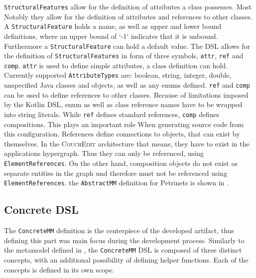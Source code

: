 
% 


% 

\texttt{StructuralFeatures} allow for the definition of attributes a class possesses. Most Notably they allow for the definition of attributes and references to other classes. A \texttt{StructuralFeature} holds a name, as well as upper and lower bound definitions, where an upper bound of `-1` indicates that it is unbound. Furthermore a \texttt{StructuralFeature} can hold a default value. The DSL allows for the definition of \texttt{StructuralFeatures} in form of three symbols, \texttt{attr}, \texttt{ref} and \texttt{comp}. \texttt{attr} is used to define simple attributes, a class definition can hold. Currently supported \texttt{AttributeTypes} are: boolean, string, integer, double, unspecified Java classes and objects, as well as any enums defined. \texttt{ref} and \texttt{comp} can be used to define references to other classes. Because of limitations imposed by the Kotlin DSL, enum as well as class reference names have to be wrapped into string literals. While \texttt{ref} defines standard references, \texttt{comp} defines compositions. This plays an important role When generating source code from this configuration. References define connections to objects, that can exist by themselves. In the \textsc{CouchEdit} architecture that means, they have to exist in the applications hypergraph. Thus they can only be referenced, using \texttt{ElementReferences}. On the other hand, composition objects do not exist as separate entities in the graph und therefore must not be referenced using \texttt{ElementReferences}. the \texttt{AbstractMM} definition for Petrinets is shown in .

\subsection{Concrete DSL}
The \texttt{ConcreteMM} definition is the centerpiece of the developed artifact, thus defining this part was main focus during the development process. Similarly to the metamodel defined in , the \texttt{ConcreteMM} DSL is composed of three distinct concepts, with an additional possibility of defining helper functions. Each of the concepts is defined in its own scope.


